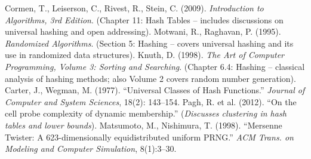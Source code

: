 \documentclass[11pt]{article}
\begin{document}
\begin{thebibliography}{10}
 Cormen, T., Leiserson, C., Rivest, R., Stein, C. (2009). \emph{Introduction to Algorithms, 3rd Edition}. (Chapter 11: Hash Tables – includes discussions on universal hashing and open addressing).
 Motwani, R., Raghavan, P. (1995). \emph{Randomized Algorithms}. (Section 5: Hashing – covers universal hashing and its use in randomized data structures).
 Knuth, D. (1998). \emph{The Art of Computer Programming, Volume 3: Sorting and Searching}. (Chapter 6.4: Hashing – classical analysis of hashing methods; also Volume 2 covers random number generation).
 Carter, J., Wegman, M. (1977). “Universal Classes of Hash Functions.” \emph{Journal of Computer and System Sciences}, 18(2): 143–154.
 Pagh, R. et al. (2012). “On the cell probe complexity of dynamic membership.” (\emph{Discusses clustering in hash tables and lower bounds}).
 Matsumoto, M., Nishimura, T. (1998). “Mersenne Twister: A 623-dimensionally equidistributed uniform PRNG.” \emph{ACM Trans. on Modeling and Computer Simulation}, 8(1):3–30.
\end{thebibliography}
\end{document}
